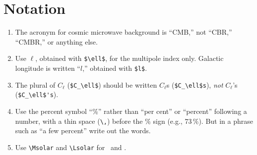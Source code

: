 \documentclass[letterpaper,11pt]{article}
\begin{document}
\section{Notation}

\begin{enumerate}

\item The acronym for cosmic microwave background is ``CMB,'' not ``CBR,''
``CMBR,'' or anything else.

\item Use $\ell$, obtained with \verb|$\ell$|, for the multipole index only.
Galactic longitude is written ``$l$,'' obtained with \verb|$l$|.

\item The plural of $C_\ell$ (\verb|$C_\ell$|) should be written $C_\ell$s
(\verb|$C_\ell$s|), {\it not\/} $C_\ell$'s (\verb|$C_\ell$'s|).
 



\item Use the percent symbol ``\%'' rather than ``per cent'' or ``percent''
following a number, with a thin space (\verb|\,|) before the \% sign (e.g., 73\,\%).
But in a phrase such as ``a few percent'' write out the words.

\item Use \verb|\Msolar| and \verb|\Lsolar| for \Msolar\ and \Lsolar.



\end{enumerate}
\end{document}
